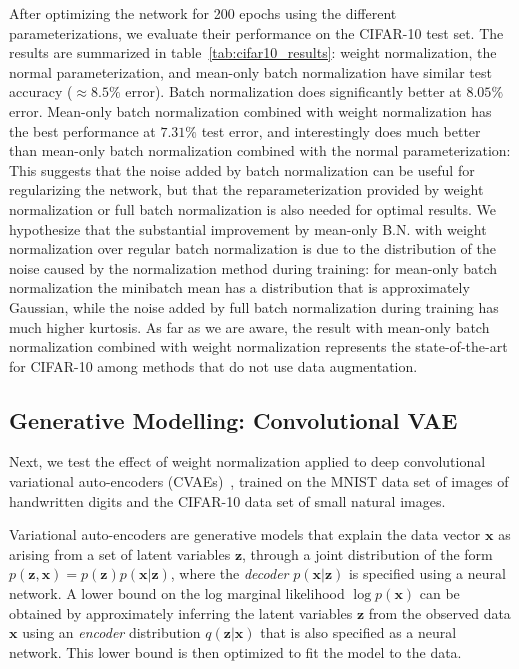 \documentclass{article}
\begin{document}
After optimizing the network for 200 epochs using the different parameterizations, we evaluate their performance on the CIFAR-10 test set. The results are summarized in table~\ref{tab:cifar10_results}: weight normalization, the normal parameterization, and mean-only batch normalization have similar test accuracy ($\approx 8.5\%$ error). Batch normalization does significantly better at $8.05\%$ error. Mean-only batch normalization combined with weight normalization has the best performance at $7.31\%$ test error, and interestingly does much better than mean-only batch normalization combined with the normal parameterization: This suggests that the noise added by batch normalization can be useful for regularizing the network, but that the reparameterization provided by weight normalization or full batch normalization is also needed for optimal results. We hypothesize that the substantial improvement by mean-only B.N. with weight normalization over regular batch normalization is due to the distribution of the noise caused by the normalization method during training: for mean-only batch normalization the minibatch mean has a distribution that is approximately Gaussian, while the noise added by full batch normalization during training has much higher kurtosis. As far as we are aware, the result with mean-only batch normalization combined with weight normalization represents the state-of-the-art for CIFAR-10 among methods that do not use data augmentation.

\subsection{Generative Modelling: Convolutional VAE}
\label{sec:conv_vae}
Next, we test the effect of weight normalization applied to deep convolutional variational auto-encoders (CVAEs)~\cite{kingma2013auto,rezende2014stochastic,salimans2014markov}, trained on the MNIST data set of images of handwritten digits and the CIFAR-10 data set of small natural images.

Variational auto-encoders are generative models that explain the data vector $\mathbf{x}$ as arising from a set of latent variables $\mathbf{z}$, through a joint distribution of the form $p(\mathbf{z},\mathbf{x}) = p(\mathbf{z})p(\mathbf{x}|\mathbf{z})$, where the \emph{decoder} $p(\mathbf{x}|\mathbf{z})$ is specified using a neural network. A lower bound on the log marginal likelihood $\log p(\mathbf{x})$ can be obtained by approximately inferring the latent variables $\mathbf{z}$ from the observed data $\mathbf{x}$ using an \emph{encoder} distribution $q(\mathbf{z}|\mathbf{x})$ that is also specified as a neural network. This lower bound is then optimized to fit the model to the data.
\end{document}
